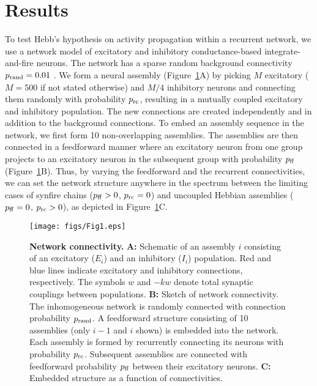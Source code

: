 \section{Results}
  To test Hebb's hypothesis on activity propagation within a recurrent network,
  we use a network model of excitatory and inhibitory conductance-based
  integrate-and-fire neurons. The network has a sparse random background
  connectivity $p_{\rm rand}=0.01$ \citep{Guzman2016}. We form a neural assembly (Figure~\ref{fig1}A)
  by picking $M$ excitatory ($M=500$ if not stated otherwise) and $M/4$
  inhibitory neurons and connecting them randomly with probability $p_{\rm
  rc}$, resulting in a mutually coupled excitatory and inhibitory population.
  The new connections are created independently and in addition to the
  background connections. To embed an assembly sequence in the network, we
  first form 10 non-overlapping assemblies. The assemblies are then connected
  in a feedforward manner where an excitatory neuron from one group projects to
  an excitatory neuron in the subsequent group with probability $p_{\rm ff}$
  (Figure~\ref{fig1}B). Thus, by varying the feedforward and the recurrent
  connectivities, we can set the network structure anywhere in the spectrum
  between the limiting cases of synfire chains ($p_{\rm ff}>0$, $p_{\rm rc} =
  0$) and uncoupled Hebbian assemblies ($p_{\rm ff} = 0$, $p_{\rm rc}>0$), as
  depicted in Figure~\ref{fig1}C.

    \begin{figure}[!h]
      \center
      \texttt{[image: figs/Fig1.eps]}
      \caption{{\bf Network connectivity.}
        \textbf{A:} Schematic of an assembly $i$ consisting of an excitatory
        ($E_i$) and an inhibitory ($I_i$) population. Red and blue lines
        indicate excitatory and inhibitory connections, respectively. The
        symbols $w$ and $-kw$ denote total synaptic couplings between
        populations.
        \textbf{B:} Sketch of network connectivity. The inhomogeneous network
        is randomly connected with connection probability $p_{\rm rand}$. A
        feedforward structure consisting of 10 assemblies (only $i-1$ and $i$
        shown) is embedded into the network. Each assembly is formed by
        recurrently connecting its neurons with probability $p_{\rm rc}$.
        Subsequent assemblies are connected with feedforward probability
        $p_{\rm ff}$ between their excitatory neurons.
        \textbf{C:} Embedded structure as a function of connectivities.
      }
      \label{fig1}
    \end{figure}

